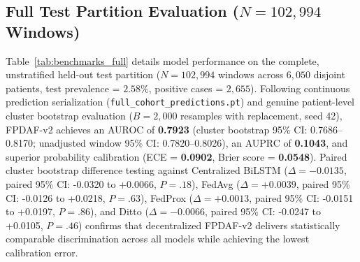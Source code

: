 \documentclass[11pt,a4paper]{article}
\begin{document}
\begin{table}[!t]
\caption*{\footnotesize \textit{Note:} Operating metrics evaluated at default threshold $\tau=0.50$. Unadjusted 95\% CIs are derived via Hanley-McNeil (1982). Cluster bootstrap 95\% CIs are derived via genuine patient-level cluster bootstrap ($B=2,000$ resamples with replacement, seed 42) retaining all trajectory windows per sampled patient encounter. Models are partitioned into Panel A (client-stratified sampling: 5,000 windows per hospital node, 408 positives, prevalence 2.72\%, $M=4,127$ patients) and Panel B (uniform multi-center pooled sampling: 387 positives, prevalence 2.58\%, $M=4,207$ patients). Cross-panel comparisons reflect differing empirical sampling structures and must not be interpreted as direct matched comparisons. ECE = Expected Calibration Error; Brier Score measures probability mean squared error.}
\end{table}

\subsection{Full Test Partition Evaluation ($N=102,994$ Windows)}
Table~\ref{tab:benchmarks_full} details model performance on the complete, unstratified held-out test partition ($N=102,994$ windows across $6,050$ disjoint patients, test prevalence = $2.58\%$, positive cases = $2,655$). Following continuous prediction serialization (\texttt{full\_cohort\_predictions.pt}) and genuine patient-level cluster bootstrap evaluation ($B=2,000$ resamples with replacement, seed 42), FPDAF-v2 achieves an AUROC of \textbf{0.7923} (cluster bootstrap 95\% CI: 0.7686--0.8170; unadjusted window 95\% CI: 0.7820--0.8026), an AUPRC of \textbf{0.1043}, and superior probability calibration (ECE = \textbf{0.0902}, Brier score = \textbf{0.0548}). Paired cluster bootstrap difference testing against Centralized BiLSTM ($\Delta = -0.0135$, paired 95\% CI: -0.0320 to +0.0066, $P = .18$), FedAvg ($\Delta = +0.0039$, paired 95\% CI: -0.0126 to +0.0218, $P = .63$), FedProx ($\Delta = +0.0013$, paired 95\% CI: -0.0151 to +0.0197, $P = .86$), and Ditto ($\Delta = -0.0066$, paired 95\% CI: -0.0247 to +0.0105, $P = .46$) confirms that decentralized FPDAF-v2 delivers statistically comparable discrimination across all models while achieving the lowest calibration error.
\end{document}
